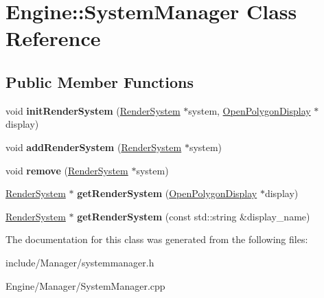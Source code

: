 \hypertarget{classEngine_1_1SystemManager}{}\section{Engine\+:\+:System\+Manager Class Reference}
\label{classEngine_1_1SystemManager}
\subsection*{Public Member Functions}
\begin{DoxyCompactItemize}
\item 
\hypertarget{classEngine_1_1SystemManager_af76c984e9be4c19b7de25c5cc74c5ec6}{}void {\bfseries init\+Render\+System} (\hyperlink{classEngine_1_1RenderSystem}{Render\+System} $\ast$system, \hyperlink{classEngine_1_1OpenPolygonDisplay}{Open\+Polygon\+Display} $\ast$display)\label{classEngine_1_1SystemManager_af76c984e9be4c19b7de25c5cc74c5ec6}

\item 
\hypertarget{classEngine_1_1SystemManager_adae43b84d821412c40fcf7cce9b82e9a}{}void {\bfseries add\+Render\+System} (\hyperlink{classEngine_1_1RenderSystem}{Render\+System} $\ast$system)\label{classEngine_1_1SystemManager_adae43b84d821412c40fcf7cce9b82e9a}

\item 
\hypertarget{classEngine_1_1SystemManager_afa6e5ada4faca9616b1a716aabb57d3c}{}void {\bfseries remove} (\hyperlink{classEngine_1_1RenderSystem}{Render\+System} $\ast$system)\label{classEngine_1_1SystemManager_afa6e5ada4faca9616b1a716aabb57d3c}

\item 
\hypertarget{classEngine_1_1SystemManager_a50d3cba3c69e62aafcee12f6920dcf66}{}\hyperlink{classEngine_1_1RenderSystem}{Render\+System} $\ast$ {\bfseries get\+Render\+System} (\hyperlink{classEngine_1_1OpenPolygonDisplay}{Open\+Polygon\+Display} $\ast$display)\label{classEngine_1_1SystemManager_a50d3cba3c69e62aafcee12f6920dcf66}

\item 
\hypertarget{classEngine_1_1SystemManager_aae06957a15832ba44c334f977eb76b09}{}\hyperlink{classEngine_1_1RenderSystem}{Render\+System} $\ast$ {\bfseries get\+Render\+System} (const std\+::string \&display\+\_\+name)\label{classEngine_1_1SystemManager_aae06957a15832ba44c334f977eb76b09}

\end{DoxyCompactItemize}


The documentation for this class was generated from the following files\+:\begin{DoxyCompactItemize}
\item 
include/\+Manager/systemmanager.\+h\item 
Engine/\+Manager/System\+Manager.\+cpp\end{DoxyCompactItemize}
